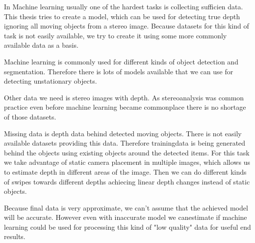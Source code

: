 In Machine learning usually one of the hardest tasks is collecting sufficien data.
This thesis tries to create a model, which can be used for detecting true depth ignoring all moving objects from a stereo image.
Because datasets for this kind of task is not easily available, we try to create it using some more commonly available data as a basis.

Machine learning is commonly used for different kinds of object detection and segmentation. Therefore there is lots of models available that we can use for detecting unstationary objects.

Other data we need is stereo images with depth. As stereoanalysis was common practice even before machine learning became commonplace there is no shortage of those datasets.

Missing data is depth data behind detected moving objects. There is not easily available datasets providing this data. 
Therefore trainingdata is being generated behind the objects using existing objects around the detected items. 
For this task we take advantage of static camera placement in multiple images, which allows us to estimate depth in different areas of the image.
Then we can do different kinds of swipes towards different depths achiecing linear depth changes instead of static objects.

Because final data is very approximate, we can't assume that the achieved model will be accurate.
However even with inaccurate model we canestimate if machine learning could be used for processing this kind of "low quality" data for useful end results.
